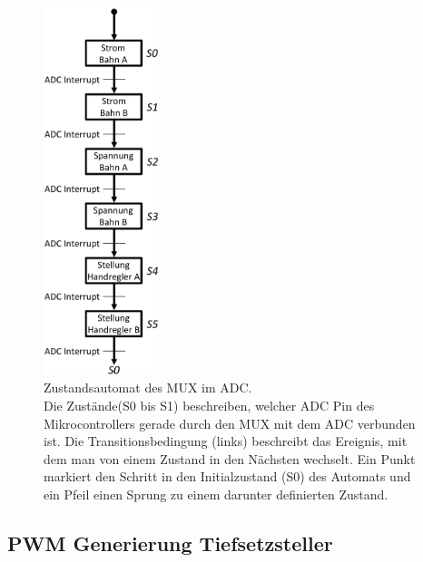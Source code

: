 \documentclass[a4paper, 11pt]{report}
\begin{document}
		\begin{figure}[ht]
			\centering
			\includegraphics[width=0.3\textwidth]{rec/ADCAutomat.png}
			\caption[Zustandsautomat des MUX im ADC]{Zustandsautomat des MUX im ADC.\\Die Zustände(S0 bis S1) beschreiben, welcher ADC Pin des Mikrocontrollers gerade durch den MUX mit dem ADC verbunden ist. Die Transitionsbedingung (links) beschreibt das Ereignis, mit dem man von einem Zustand in den Nächsten wechselt. Ein Punkt markiert den Schritt in den Initialzustand (S0) des Automats und ein Pfeil einen Sprung zu einem darunter definierten Zustand.}
			\label{img:ADCMUX}
		\end{figure}

\subsection{PWM Generierung Tiefsetzsteller}\label{subsec:PWM}
\end{document}
